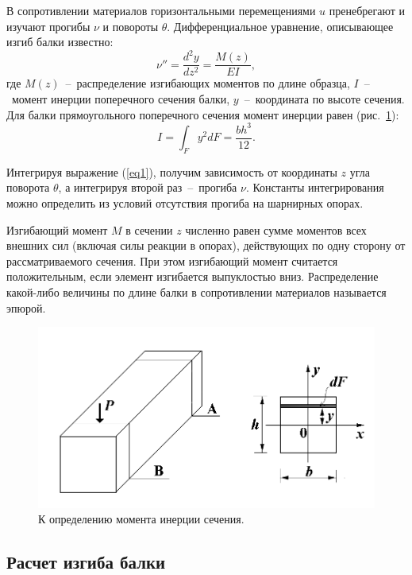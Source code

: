 \documentclass[12pt, a4paper]{article}
\begin{document}
    В сопротивлении материалов горизонтальными перемещениями $u$ пренебрегают и изучают прогибы $\nu$ и повороты $\theta$. Дифференциальное уравнение, описывающее изгиб балки известно:
    \begin{equation}
        \nu'' = \frac{d^{2}y}{dz^{2}} = \frac{M(z)}{EI},
        \label{eq1}
    \end{equation}
    где $M(z)$~--~распределение изгибающих моментов по длине образца, $I$~--~момент инерции поперечного сечения балки, $y$~--~координата по высоте сечения. Для балки прямоугольного поперечного сечения момент инерции равен (рис.~\ref{im3}):
    \begin{equation}
        I = \int_{F} y^{2} dF = \frac{bh^{3}}{12}.
        \label{eq2}
    \end{equation}
    
    Интегрируя выражение (\ref{eq1}), получим зависимость от координаты $z$ угла поворота $\theta$, а интегрируя второй раз~--~прогиба $\nu$. Константы интегрирования можно определить из условий отсутствия прогиба на шарнирных опорах.
    
    Изгибающий момент $M$ в сечении $z$ численно равен сумме моментов всех внешних сил (включая силы реакции в опорах), действующих по одну сторону от рассматриваемого сечения. При этом изгибающий момент считается положительным, если элемент изгибается выпуклостью вниз. Распределение какой-либо величины по длине балки в сопротивлении материалов называется эпюрой.
    
    \newpage
    
    \begin{figure}[h]
        \centering
        \includegraphics[width = 12cm]{image_3.png}
        \caption{К определению момента инерции сечения.}
        \label{im3}
    \end{figure}
    
    \subsection{Расчет изгиба балки}
    
\end{document}
